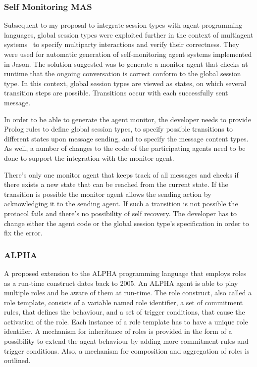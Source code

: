 \documentclass[a4paper,12pt,oneside,fleqn]{book} %
\begin{document}
\subsubsection{Self Monitoring MAS} %
Subsequent to my proposal to integrate session types with agent programming
languages, global session types were exploited further in the context of
multiagent systems~\cite{DBLP:conf/dalt/AnconaDM12} to specify multiparty
interactions and verify their correctness. They were used for automatic
generation of self-monitoring agent systems implemented in Jason. The
solution suggested was to generate a monitor agent that checks at runtime
that the ongoing conversation is correct conform to the global session
type. In this context, global session types are viewed as states, on which
several transition steps are possible. Transitions occur with each
successfully sent message.

In order to be able to generate the agent monitor, the developer needs to
provide Prolog rules to define global session types, to specify possible
transitions to different states upon message sending, and to specify the
message content types. As well, a number of changes to the code of the
participating agents need to be done to support the integration with the
monitor agent.

There's only one monitor agent that keeps track of all messages and checks
if there exists a new state that can be reached from the current state. If
the transition is possible the monitor agent allows the sending action by
acknowledging it to the sending agent. If such a transition is not
possible the protocol fails and there's no possibility of self recovery.
The developer has to change either the agent code or the global session
type's specification in order to fix the error.

\subsubsection{ALPHA} %
A proposed extension to the ALPHA programming language that employs roles
as a run-time construct dates back to 2005\cite{Collier_arole-based}. An
ALPHA agent is able to play multiple roles and be aware of them at
run-time. The role construct, also called a role template, consists of a
variable named role identifier, a set of commitment rules, that defines the
behaviour, and a set of trigger conditions, that cause the activation of
the role. Each instance of a role template has to have a unique role
identifier. A mechanism for inheritance of roles is provided in the form of
a possibility to  extend the agent behaviour by adding more commitment
rules and trigger conditions.  Also, a mechanism for composition and
aggregation of roles is outlined.
\end{document}
